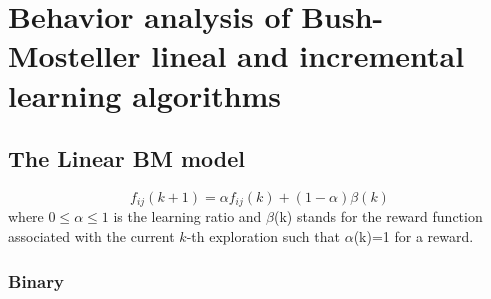 \newpage
\setcounter{secnumdepth}{1}
\section{Behavior analysis of Bush-Mosteller lineal and incremental learning algorithms}

\subsection{The Linear BM model}
$$f_{ij}(k+1) =α f_{ij}(k)  + (1-\alpha) \beta (k)$$ where $0 \leq \alpha \leq 1$  is the learning ratio and $\beta$(k) stands for the reward function associated with  the current  $k$-th exploration such that $\alpha$(k)=1 for a reward.


\subsubsection{Binary}

